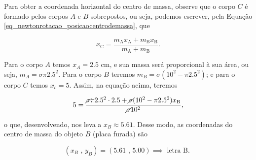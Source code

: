 \begin{exemplo}
{\label{fig_rotacao_centrodemassaitaexemplo3}
} 
\vspace{0.3cm}

Para obter a coordenada horizontal do centro de massa, observe que o corpo $C$ é formado pelos corpos $A$ e $B$ sobrepostos, ou seja, podemos escrever, pela Equação \eqref{eq_newtonrotacao_posicaocentrodemassa}, que

$$ x_\text{C} = \dfrac{m_\text{A} x_\text{A} + m_\text{B} x_\text{B} }{m_\text{A} + m_\text{B}}.$$

Para o corpo $A$ temos $x_A = 2.5$ cm, e sua massa será proporcional à sua área, ou seja, $m_A = \sigma \pi 2.5^2.$ Para o corpo $B$ teremos $m_B = \sigma (10^2 - \pi 2.5^2)$; e para o corpo $C$ temos $x_c = 5$. Assim, na equação acima, teremos


$$ 5 = \dfrac{\cancel\sigma \pi 2.5^2 \cdot 2.5 + \cancel \sigma (10^2 - \pi 2.5^2) x_\text{B} }{\cancel \sigma 10^2},$$

\noindent o que, desenvolvendo, nos leva a $x_B \approx 5.61 $. Desse modo, as coordenadas do centro de massa do objeto $B$ (placa furada) são

$$ \boxed{ (x_B\text{ , }y_B) = (5.61 \text{ , } 5.00) \implies \text{ letra B. }}$$




\end{exemplo}

\vspace{0.3cm}


